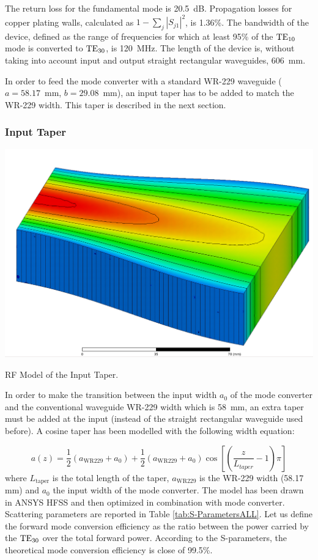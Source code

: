 The return loss for the fundamental mode is 20.5~dB. Propagation losses for copper plating walls, calculated as $1-\sum_{j}\left|S_{j1}\right|^{2}$, is 1.36\%. The bandwidth of the device, defined as the range of frequencies for which at least 95\% of the ${\mathrm{TE}}_{10}$ mode is converted to ${\mathrm{TE}}_{30}$, is 120~MHz.
The length of the device is, without taking into account input and output straight rectangular waveguides, 606~mm.


In order to feed the mode converter with a standard WR-229 waveguide ($a=58.17$~mm, $b=29.08$~mm), 
an input taper has to be added to match the WR-229 width. This taper is described in the next section.

\subsubsection{Input Taper}
\begin{marginfigure}
	\includegraphics[width=1.0\textwidth]{figures/chap3/ITER_modeconverter/HFSS_ModeConverterTaper}
	\caption{RF Model of the Input Taper. }
	\label{fig:taper}
\end{marginfigure}
In order to make the transition between the input width $a_{0}$ of the mode converter and the conventional waveguide WR-229 width which is 58~mm, an extra taper must be added at the input (instead of the straight rectangular waveguide used before). A cosine taper has been modelled with the following width equation:

\begin{equation}
a(z)=\frac{1}{2} 
\left(a_{\mbox{WR229}}+a_{0}\right)
+\frac{1}{2}\left(a_{\mbox{WR229}}+a_{0}\right)
\cos\left[\left(\frac{z}{L_{taper}}-1\right)\pi\right]
\end{equation}
where $L_{\mbox{taper}}$ is the total length of the taper, $a_{\mbox{WR229}}$ is the WR-229 width (58.17\,mm) and $a_{0}$ the input width of the mode converter. The model has been drawn in ANSYS HFSS and then optimized in combination with mode converter. Scattering parameters are reported in Table \ref{tab:S-ParametersALL}. Let us define the forward mode conversion efficiency as the ratio between the power carried by the ${\mathrm{TE}}_{30}$ over the total forward power. According to the S-parameters, the theoretical mode conversion efficiency is close of 99.5\%. 

